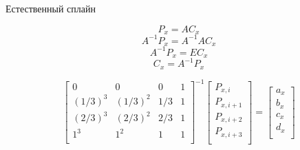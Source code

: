 \documentclass{beamer}
\begin{document}
\begin{frame}{Естественный сплайн}
{			\[
				P_x = A C_x
			\]
			\[
				A^{-1} P_x = A^{-1} A C_x
			\]
			\[
				A^{-1} P_x = E C_x
			\]
			\[
				C_x = A^{-1} P_x
			\]

			\[
				\begin{bmatrix}
					0 & 0 & 0 & 1 \\
					(1/3)^3 & (1/3)^2 & 1/3 & 1 \\
					(2/3)^3 & (2/3)^2 & 2/3 & 1 \\
					1^3 & 1^2 & 1 & 1 \\
				\end{bmatrix}^{-1}
				\begin{bmatrix}
					P_{x,i} \\
					P_{x,i+1} \\
					P_{x,i+2} \\
					P_{x,i+3} \\
				\end{bmatrix}
				=
				\begin{bmatrix}
					a_x \\
					b_x \\
					c_x \\
					d_x \\
				\end{bmatrix}
			\]
		}

	\end{frame}
\end{document}
